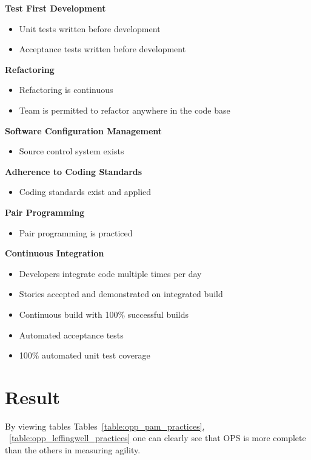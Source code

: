 \textbf{Test First Development}
\begin{itemize}
	\item Unit tests written before development
	\item Acceptance tests written before development
\end{itemize}

\textbf{Refactoring}
\begin{itemize}
	\item Refactoring is continuous
	\item Team is permitted to refactor anywhere in the code base
\end{itemize}

\textbf{Software Configuration Management}
\begin{itemize}
	\item Source control system exists
\end{itemize}

\textbf{Adherence to Coding Standards}
\begin{itemize}
	\item Coding standards exist and applied
\end{itemize}

\textbf{Pair Programming}
\begin{itemize}
	\item Pair programming is practiced
\end{itemize}

\textbf{Continuous Integration}
\begin{itemize}
	\item Developers integrate code multiple times per day
	\item Stories accepted and demonstrated on integrated build
	\item Continuous build with 100\% successful builds
	\item Automated acceptance tests
	\item 100\% automated unit test coverage
\end{itemize}

\section{Result}
By viewing tables Tables~\ref{table:opp_pam_practices}, ~\ref{table:opp_leffingwell_practices} one can clearly see that OPS is more complete than the others in measuring agility.